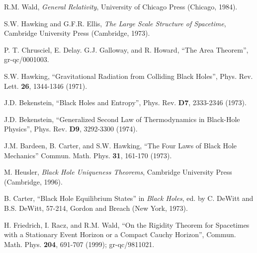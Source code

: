 \documentclass[12pt]{article}
\newcommand{\comment}[1]{}
\newcommand{\keywords}[1]{}
\begin{document}
\begin{thebibliography}{999}

\comment{book} R.M. Wald, {\it General Relativity},
University of Chicago Press (Chicago, 1984).
\keywords{black holes, event horizons, global methods}

\comment{book} S.W. Hawking and G.F.R. Ellis, {\it The
Large Scale Structure of Spacetime}, Cambridge University Press
(Cambridge, 1973).
\keywords{black holes, event horizons, global methods}

\comment{online} P. T. Chrusciel,
E. Delay. G.J. Galloway, and R. Howard, ``The Area Theorem'',
gr-qc/0001003.  \keywords{event horizons, differential geometry}

\comment{article} S.W. Hawking, ``Gravitational Radiation
from Colliding Black Holes'', Phys. Rev. Lett. {\bf 26}, 1344-1346 (1971).
\keywords{black holes, event horizons}

\comment{article} J.D. Bekenstein, ``Black Holes and
Entropy'', Phys. Rev. {\bf D7}, 2333-2346 (1973).  \keywords{black
hole thermodynamics, black holes, event horizons, generalized second
law, entropy bounds}

\comment{article} J.D. Bekenstein, ``Generalized Second
Law of Thermodynamics in Black-Hole Physics'', Phys. Rev. {\bf D9},
3292-3300 (1974).  \keywords{black hole thermodynamics, black holes,
event horizons, generalized second law, entropy bounds}

\comment{article} J.M.  Bardeen, B. Carter, and
S.W. Hawking, ``The Four Laws of Black Hole Mechanics'' Commun.
Math. Phys. {\bf 31}, 161-170 (1973).  \keywords{black hole
thermodynamics, black holes, event horizons}

\comment{book} M. Heusler, {\it Black Hole Uniqueness
Theorems}, Cambridge University Press (Cambridge, 1996).
\keywords{black holes, no-hair theorems}

\comment{inbook} B. Carter, ``Black Hole Equilibrium
States'' in {\it Black Holes}, ed. by C. DeWitt and B.S. DeWitt, 57-214,
Gordon and Breach (New York, 1973).
\keywords{black holes, no-hair theorems}

\comment{article} H. Friedrich, I. Racz, and R.M. Wald,
``On the Rigidity Theorem for Spacetimes with a Stationary Event
Horizon or a Compact Cauchy Horizon'', Commun. Math. Phys. {\bf 204},
691-707 (1999); gr-qc/9811021.
\keywords{event horizons, Killing horizons}


\end{thebibliography}
\end{document}

